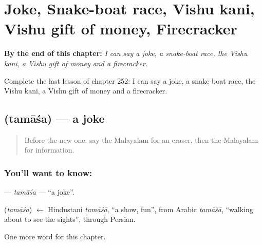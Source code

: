 
\chapter{Joke, Snake-boat race, Vishu kani, Vishu gift of money, Firecracker}
\label{ch:ml-joke-snake-boat-race-vishu-kani-vishu-gift-of-money-firecracker}

\begin{chapteropening}
\textbf{By the end of this chapter:} \emph{I can say a joke, a snake-boat race, the Vishu kani, a Vishu gift of money and a firecracker.}

Complete the last lesson of chapter 252: I can say a joke, a snake-boat race, the Vishu kani, a Vishu gift of money and a firecracker.
\end{chapteropening}

\section[\texorpdfstring{\ml{തമാശ} (tamāśa)}{തമാശ (tamāśa)}]{ (tamāśa) — a joke}

\label{lesson:ML-C252-tamasa}



\begin{quote}
Before the new one: say the Malayalam for an eraser, then the Malayalam for information.
\end{quote}

\subsection*{You'll want to know: }
\textbf{} — \emph{tamāśa} — \textquotedblleft{}a joke\textquotedblright{}.

\begin{cousinweb}
\textbf{} (\emph{tamāśa}) $\leftarrow$ Hindustani \emph{tamāśā}, \textquotedblleft{}a show, fun\textquotedblright{}, from Arabic \emph{tamāšā}, \textquotedblleft{}walking about to see the sights\textquotedblright{}, through Persian.
\end{cousinweb}

\begin{grammarlens}[title={What you've built}]
One more word for this chapter.
\end{grammarlens}

